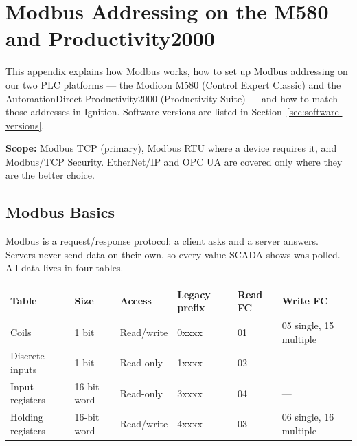 \chapter{Modbus Addressing on the M580 and Productivity2000}
\label{app:modbus}

This appendix explains how Modbus works, how to set up Modbus addressing on our two PLC platforms --- the Modicon M580 (Control Expert Classic) and the AutomationDirect Productivity2000 (Productivity Suite) --- and how to match those addresses in Ignition. Software versions are listed in Section~\ref{sec:software-versions}.

\textbf{Scope:} Modbus TCP (primary), Modbus RTU where a device requires it, and Modbus/TCP Security. EtherNet/IP and OPC UA are covered only where they are the better choice.

\section{Modbus Basics}
Modbus is a request/response protocol: a client asks and a server answers. Servers never send data on their own, so every value SCADA shows was polled. All data lives in four tables.

\begin{longtable}{@{}P{2.99cm}P{2.00cm}P{2.20cm}P{2.00cm}P{1.60cm}P{3.59cm}@{}}
\toprule
\textbf{Table} & \textbf{Size} & \textbf{Access} & \textbf{Legacy prefix} & \textbf{Read FC} & \textbf{Write FC} \\
\midrule
\endhead
Coils & 1 bit & Read/write & 0xxxx & 01 & 05 single, 15 multiple \\
Discrete inputs & 1 bit & Read-only & 1xxxx & 02 & --- \\
Input registers & 16-bit word & Read-only & 3xxxx & 04 & --- \\
Holding registers & 16-bit word & Read/write & 4xxxx & 03 & 06 single, 16 multiple \\
\bottomrule
\end{longtable}

